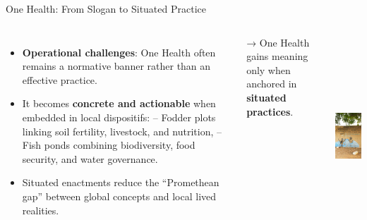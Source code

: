 \documentclass[newPxFont]{beamer}
\begin{document}
\begin{frame}[c]{One Health: From Slogan to Situated Practice}
  \vspace{-0.5cm}
  \begin{columns}[onlytextwidth,T]
    \column{\dimexpr\linewidth-30mm-5mm}

    \begin{itemize}
      \item \textbf{Operational challenges}: One Health often remains a 
            normative banner rather than an effective practice.  
      \item It becomes \textbf{concrete and actionable} when embedded in 
            local dispositifs:  
            – Fodder plots linking soil fertility, livestock, and nutrition,  
            – Fish ponds combining biodiversity, food security, and water governance.  
      \item Situated enactments reduce the “Promethean gap” between global 
            concepts and local lived realities.  
    \end{itemize}

    → One Health gains meaning only when anchored in \textbf{situated practices}.

    \column{30mm}
    \includegraphics[height=7.5cm]{img/billarzioz}
  \end{columns}
\end{frame}
\end{document}
